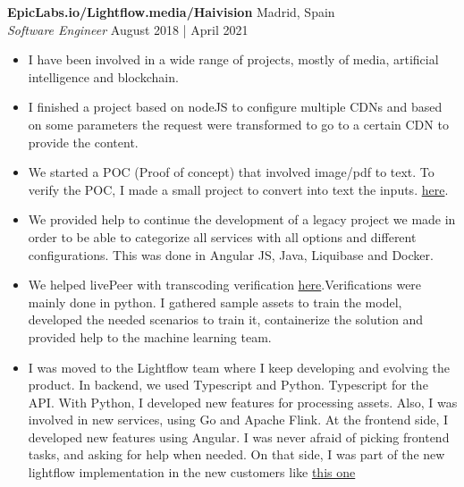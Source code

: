 \documentclass[a4paper]{article}
\begin{document}
\textbf{EpicLabs.io/Lightflow.media/Haivision} \hfill Madrid, Spain\\
\textit{Software Engineer} \hfill August 2018 | April 2021\\
\vspace{-1mm}
\begin{itemize} \itemsep 1pt
    \item I have been involved in a wide range of projects, mostly of media, artificial intelligence and blockchain.
    \item I finished a project based on nodeJS to configure multiple CDNs and based on some parameters the request were transformed to go to a certain CDN to provide the content.
    \item We started a POC (Proof of concept) that involved image/pdf to text. To verify the POC, I made a small project to convert into text the inputs. \href{https://github.com/dionisioC/pythonOCR}{here}.
    \item We provided help to continue the development of a legacy project we made in order to be able to categorize all services with all options and different configurations. This was done in Angular JS, Java, Liquibase and Docker.
    \item We helped livePeer with transcoding verification \href{https://github.com/livepeer/verification-classifier}{here}.Verifications were mainly done in python. I gathered sample assets to train the model, developed the needed scenarios to train it, containerize the solution and provided help to the machine learning team.
    \item I was moved to the Lightflow team where I keep developing and evolving the product. In backend, we used Typescript and Python. Typescript for the API. With Python, I developed new features for processing assets. Also, I was involved in new services, using Go and Apache Flink.
At the frontend side, I developed new features using Angular. I was never afraid of picking frontend tasks, and asking for help when needed. On that side, I was part of the new lightflow implementation in the new customers like \href{https://www.linkedin.com/posts/jesusoliva_intelligent-encoding-drives-dramatic-cost-activity-6709093686086647808-ruhL}{this one}
\end{itemize}
\end{document}
